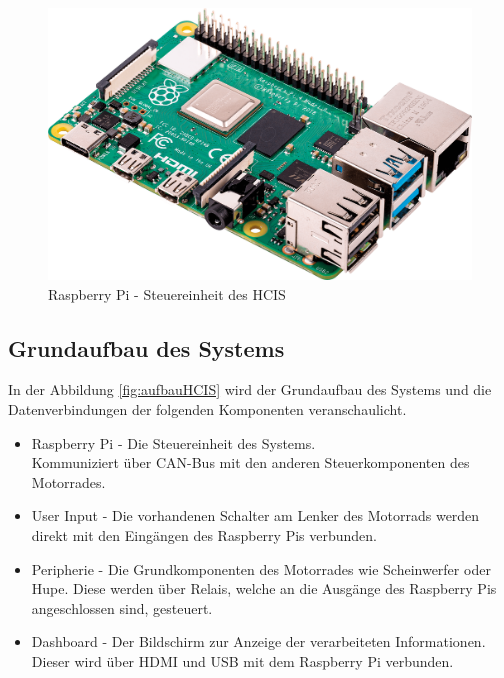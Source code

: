 \begin{figure}[H]
	\begin{center}
		\includegraphics[scale=0.08]{figures/hcis/raspberryPi.png}
		\caption{Raspberry Pi - Steuereinheit des HCIS}
	\end{center}
\end{figure}

\subsection{Grundaufbau des Systems}

In der Abbildung \ref{fig:aufbauHCIS} wird der Grundaufbau des Systems und die Datenverbindungen der folgenden  Komponenten veranschaulicht.

\begin{itemize}
	
	\item Raspberry Pi - Die Steuereinheit des Systems.
	\\ Kommuniziert über CAN-Bus mit den anderen Steuerkomponenten des Motorrades.
	
	\item User Input - Die vorhandenen Schalter am Lenker des Motorrads werden direkt mit den Eingängen des Raspberry Pis verbunden. 
	
	\item Peripherie - Die Grundkomponenten des Motorrades wie Scheinwerfer oder Hupe. Diese werden über Relais, welche an die Ausgänge des Raspberry Pis angeschlossen sind, gesteuert.
	
	\item Dashboard - Der Bildschirm zur Anzeige der verarbeiteten Informationen. Dieser wird über HDMI und USB mit dem Raspberry Pi verbunden.
	
\end{itemize}

